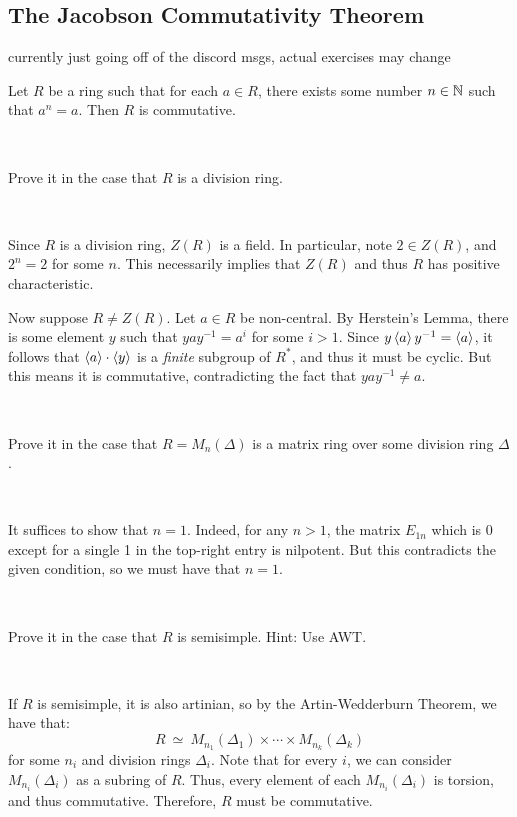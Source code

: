 \subsection{The Jacobson Commutativity Theorem}

currently just going off of the discord msgs, actual exercises may change

\begin{thm}[title=Jacobson Commutativity Theorem]
	Let $R$ be a ring such that for each $a\in R$, there exists some number
	$n \in\mathbb{N}$ such that $a^{n}=a$. Then $R$ is commutative.
\end{thm} \

\begin{exr}
	Prove it in the case that $R$ is a division ring.
\end{exr} \

\begin{pf}
	Since $R$ is a division ring, $Z(R)$ is a field.
	In particular, note $2\in Z(R)$, and $2^{n}=2$ for some $n$.
	This necessarily implies that $Z(R)$ and thus $R$ has positive
	characteristic.
	
	Now suppose $R\neq Z(R)$. Let $a\in R$ be non-central.
	By Herstein's Lemma, there is some element $y$ such that $yay^{-1}=a^{i}$
	for some $i>1$.
	Since $y\left\langle{a}\right\rangle y^{-1}=\left\langle{a}\right\rangle$, it follows that $\left\langle{a}\right\rangle\cdot\left\langle{y}\right\rangle$ is a
	\textit{finite} subgroup of $R^{*}$, and thus it must be cyclic.
	But this means it is commutative, contradicting the fact that $yay^{-1}\neq a$.
\end{pf} \

\begin{exr}
	Prove it in the case that $R=M_{n}(\Delta)$ is a matrix ring over some
	division ring $\Delta$.
\end{exr} \

\begin{pf}
	It suffices to show that $n=1$.
	Indeed, for any $n>1$, the matrix $E_{1n}$ which is 0 except for a single
	1 in the top-right entry is nilpotent.
	But this contradicts the given condition, so we must have that $n=1$.
\end{pf} \

\begin{exr}
	Prove it in the case that $R$ is semisimple. Hint: Use AWT.
\end{exr} \

\begin{pf}
	If $R$ is semisimple, it is also artinian, so by the
	Artin-Wedderburn Theorem, we have that:
	\begin{equation*}
		R \ \simeq \ M_{n_{1}}(\Delta_{1}) \times \cdots \times M_{n_{k}}(\Delta_{k})
	\end{equation*}
	for some $n_{i}$ and division rings $\Delta_{i}$.
	Note that for every $i$, we can consider $M_{n_{i}}(\Delta_{i})$ as a
	subring of $R$.
	Thus, every element of each $M_{n_{i}}(\Delta_{i})$ is torsion, and thus
	commutative.
	Therefore, $R$ must be commutative.
\end{pf} \

